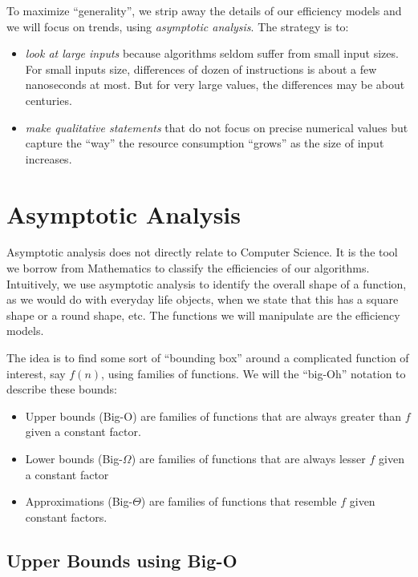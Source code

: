 \documentclass{aldast}
\begin{document}
To maximize ``generality'', we strip away the details of our
efficiency models and we will focus on trends, using \emph{asymptotic
  analysis}. The strategy is to:
\begin{itemize}
\item \emph{look at large inputs} because algorithms seldom suffer
  from small input sizes. For small inputs size, differences of dozen
  of instructions is about a few nanoseconds at most. But for very
  large values, the differences may be about centuries.
\item \emph{make qualitative statements} that do not focus on precise
  numerical values but capture the ``way'' the resource consumption
  ``grows'' as the size of input increases.
\end{itemize}


\section{Asymptotic Analysis}
Asymptotic analysis does not directly relate to Computer Science. It
is the tool we borrow from Mathematics to classify the efficiencies of
our algorithms. Intuitively, we use asymptotic analysis to identify
the overall shape of a function, as we would do with everyday life
objects, when we state that this has a square shape or a round shape,
etc. The functions we will manipulate are the efficiency models.

The idea is to find some sort of ``bounding box'' around a complicated
function of interest, say $f(n)$, using families of functions. We will
the ``big-Oh'' notation to describe these bounds:

\begin{itemize}
\item Upper bounds (Big-O) are families of functions that are always
greater than $f$ given a constant factor.
\item Lower bounds (Big-$\Omega$) are families of functions that are
  always lesser $f$ given a constant factor
\item Approximations (Big-$\Theta$) are families of functions that
  resemble $f$ given constant factors.
\end{itemize}

\subsection{Upper Bounds using Big-O}

\end{document}

